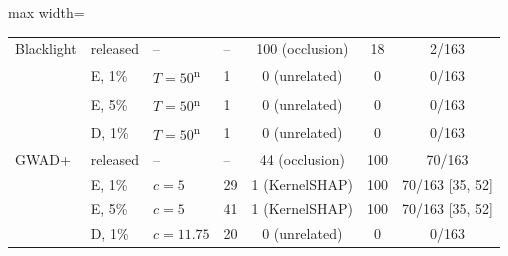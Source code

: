 \begin{table}[!tbp]
\begin{adjustbox}{max width=\textwidth}
\begin{tabular}{llllccc}
Blacklight & released & -- & -- & 100 (occlusion) & 18 & 2/163 \\
 & E, 1\% & $T=50$\textsuperscript{n} & 1 & 0 (unrelated) & 0 & 0/163 \\
 & E, 5\% & $T=50$\textsuperscript{n} & 1 & 0 (unrelated) & 0 & 0/163 \\
 & D, 1\% & $T=50$\textsuperscript{n} & 1 & 0 (unrelated) & 0 & 0/163 \\
GWAD+ & released & -- & -- & 44 (occlusion) & 100 & 70/163 \\
 & E, 1\% & $c=5$ & 29 & 1 (KernelSHAP) & 100 & 70/163 [35, 52] \\
 & E, 5\% & $c=5$ & 41 & 1 (KernelSHAP) & 100 & 70/163 [35, 52] \\
 & D, 1\% & $c=11.75$ & 20 & 0 (unrelated) & 0 & 0/163 \\
\bottomrule
\end{tabular}
\end{adjustbox}
\end{table}
